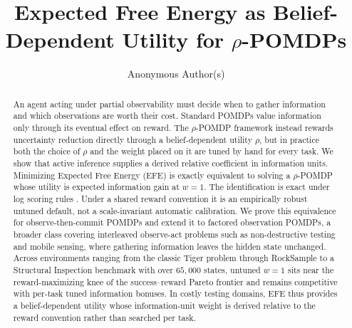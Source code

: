 \documentclass[runningheads]{llncs}
\begin{document}
\title{Expected Free Energy as Belief-Dependent Utility for $\rho$-POMDPs}


\author{Anonymous Author(s)}



\maketitle

\begin{abstract}
An agent acting under partial observability must decide when to gather information and which observations are worth their cost. Standard POMDPs value information only through its eventual effect on reward. The $\rho$-POMDP framework instead rewards uncertainty reduction directly through a belief-dependent utility $\rho$, but in practice both the choice of $\rho$ and the weight placed on it are tuned by hand for every task. We show that active inference supplies a derived relative coefficient in information units. Minimizing Expected Free Energy (EFE) is exactly equivalent to solving a $\rho$-POMDP whose utility is expected information gain at $w{=}1$. The identification is exact under log scoring rules \citep{bernardo1979}. Under a shared reward convention it is an empirically robust untuned default, not a scale-invariant automatic calibration. We prove this equivalence for observe-then-commit POMDPs and extend it to factored observation POMDPs, a broader class covering interleaved observe-act problems such as non-destructive testing and mobile sensing, where gathering information leaves the hidden state unchanged. Across environments ranging from the classic Tiger problem through RockSample to a Structural Inspection benchmark with over $65{,}000$ states, untuned $w{=}1$ sits near the reward-maximizing knee of the success--reward Pareto frontier and remains competitive with per-task tuned information bonuses. In costly testing domains, EFE thus provides a belief-dependent utility whose information-unit weight is derived relative to the reward convention rather than searched per task.
\end{abstract}
\end{document}
